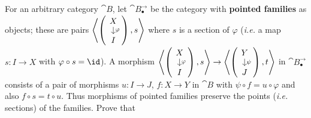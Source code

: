 \begin{exercise}
For an arbitrary category \(\cat{B}\), let \(\cat{B}_{\bullet}^{\rightarrow}\) be the category with \textbf{pointed families} as objects;
these are pairs \(\left\langle\begin{pmatrix}\begin{tikzcd}[row sep=small] X \arrow[d, "\varphi"] \\ I\end{tikzcd}\end{pmatrix}, s\right\rangle\) where \(s\) is a section of \(\varphi\)
(\emph{i.e.} a map \(s : I \to X\) with \(\varphi \circ s = \id\)).
A morphism \(\left\langle\begin{pmatrix}\begin{tikzcd}[row sep=small] X \arrow[d, "\varphi"] \\ I\end{tikzcd}\end{pmatrix}, s\right\rangle \to \left\langle\begin{pmatrix}\begin{tikzcd}[row sep=small] Y \arrow[d, "\psi"] \\ J\end{tikzcd}\end{pmatrix}, t\right\rangle\) in \(\cat{B}_{\bullet}^{\rightarrow}\) consists of a pair of morphisms \(u : I \to J\), \(f : X \to Y\) in \(\cat{B}\) with \(\psi \circ f = u \circ \varphi\) and also \(f \circ s = t \circ u\).
Thus morphisms of pointed families preserve the points (\emph{i.e.} sections) of the families.
Prove that
\end{exercise}